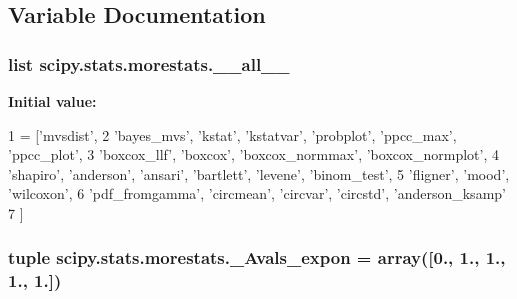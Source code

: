 \subsection{Variable Documentation}
\hypertarget{namespacescipy_1_1stats_1_1morestats_a4e1f06698420102c9803c6e61d1f61ca}{}
\subsubsection[{\+\_\+\+\_\+all\+\_\+\+\_\+}]{\setlength{\rightskip}{0pt plus 5cm}list scipy.\+stats.\+morestats.\+\_\+\+\_\+all\+\_\+\+\_\+}\label{namespacescipy_1_1stats_1_1morestats_a4e1f06698420102c9803c6e61d1f61ca}
{\bfseries Initial value\+:}
\begin{DoxyCode}
1 = [\textcolor{stringliteral}{'mvsdist'},
2            \textcolor{stringliteral}{'bayes\_mvs'}, \textcolor{stringliteral}{'kstat'}, \textcolor{stringliteral}{'kstatvar'}, \textcolor{stringliteral}{'probplot'}, \textcolor{stringliteral}{'ppcc\_max'}, \textcolor{stringliteral}{'ppcc\_plot'},
3            \textcolor{stringliteral}{'boxcox\_llf'}, \textcolor{stringliteral}{'boxcox'}, \textcolor{stringliteral}{'boxcox\_normmax'}, \textcolor{stringliteral}{'boxcox\_normplot'},
4            \textcolor{stringliteral}{'shapiro'}, \textcolor{stringliteral}{'anderson'}, \textcolor{stringliteral}{'ansari'}, \textcolor{stringliteral}{'bartlett'}, \textcolor{stringliteral}{'levene'}, \textcolor{stringliteral}{'binom\_test'},
5            \textcolor{stringliteral}{'fligner'}, \textcolor{stringliteral}{'mood'}, \textcolor{stringliteral}{'wilcoxon'},
6            \textcolor{stringliteral}{'pdf\_fromgamma'}, \textcolor{stringliteral}{'circmean'}, \textcolor{stringliteral}{'circvar'}, \textcolor{stringliteral}{'circstd'}, \textcolor{stringliteral}{'anderson\_ksamp'}
7            ]
\end{DoxyCode}
\hypertarget{namespacescipy_1_1stats_1_1morestats_a8667e874e3198d418cb27417b6948166}{}
\subsubsection[{\+\_\+\+Avals\+\_\+expon}]{\setlength{\rightskip}{0pt plus 5cm}tuple scipy.\+stats.\+morestats.\+\_\+\+Avals\+\_\+expon = array(\mbox{[}0., 1., 1., 1., 1.\mbox{]})}\label{namespacescipy_1_1stats_1_1morestats_a8667e874e3198d418cb27417b6948166}
\hypertarget{namespacescipy_1_1stats_1_1morestats_abc2f7f99bb78a5601c155cceacd2e036}{}
